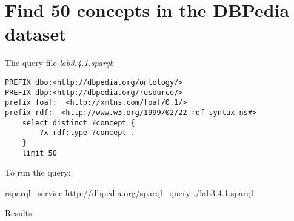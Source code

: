 \documentclass[a4paper, 12pt]{report}
\begin{document}
\section{Find 50 concepts in the DBPedia dataset}
The query file \emph{lab3.4.1.sparql}:
\begin{lstlisting}[frame=single]
PREFIX dbo:<http://dbpedia.org/ontology/>
PREFIX dbp:<http://dbpedia.org/resource/>
prefix foaf:  <http://xmlns.com/foaf/0.1/>
prefix rdf:  <http://www.w3.org/1999/02/22-rdf-syntax-ns#>
    select distinct ?concept {
        ?x rdf:type ?concept .
    }
    limit 50
\end{lstlisting}
To run the query:
\begin{commandshell}
    rsparql --service http://dbpedia.org/sparql --query ./lab3.4.1.sparql
\end{commandshell}
Results:
\end{document}
